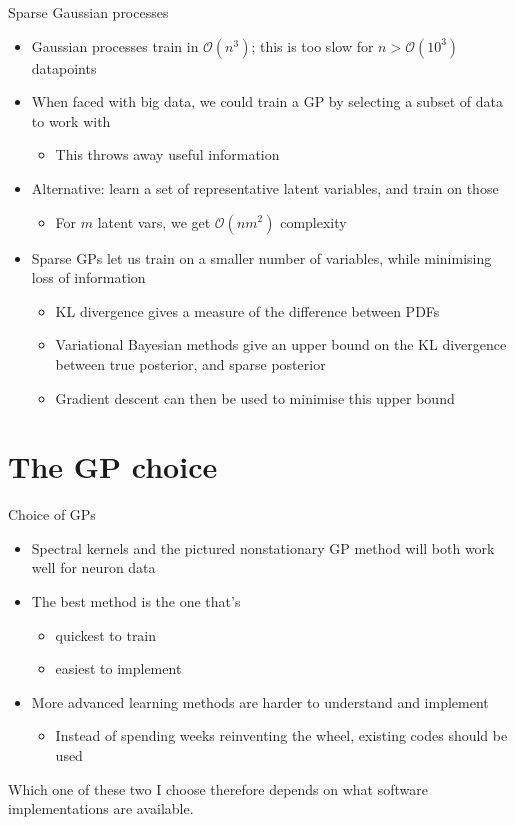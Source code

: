 \documentclass[presentation]{beamer}
\begin{document}
\begin{frame}[label={sec:orga1e7df6}]{Sparse Gaussian processes}
\begin{itemize}
\item Gaussian processes train in \(\mathcal{O}(n^3)\); this is too slow for \(n>\mathcal{O}(10^3)\) datapoints
\item When faced with big data, we could train a GP by selecting a subset of data to work with
\begin{itemize}
\item This throws away useful information
\end{itemize}
\item Alternative: learn a set of representative latent variables, and train on those
\begin{itemize}
\item For \(m\) latent vars, we get \(\mathcal{O}(nm^2)\) complexity
\end{itemize}
\item Sparse GPs let us train on a smaller number of variables, while minimising loss of information
\begin{itemize}
\item KL divergence gives a measure of the difference between PDFs
\item Variational Bayesian methods give an upper bound on the KL divergence between true posterior, and sparse posterior
\item Gradient descent can then be used to minimise this upper bound
\end{itemize}
\end{itemize}
\end{frame}


\section{The GP choice}
\label{sec:org40474ce}
\begin{frame}[label={sec:org9ffa338}]{Choice of GPs}
\begin{itemize}
\item Spectral kernels and the pictured nonstationary GP method will both work well for neuron data
\item The best method is the one that's
\begin{itemize}
\item quickest to train
\item easiest to implement
\end{itemize}
\item More advanced learning methods are harder to understand and implement
\begin{itemize}
\item Instead of spending weeks reinventing the wheel, existing codes should be used
\end{itemize}
\end{itemize}

\vfill

Which one of these two I choose therefore depends on what software implementations are available.
\end{frame}
\end{document}
